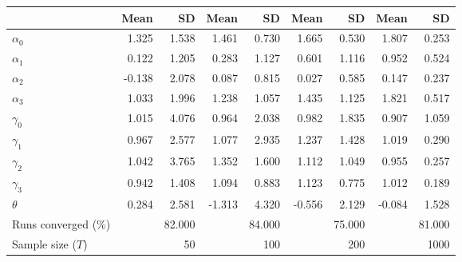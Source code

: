 
\begin{tabular}[t]{lrrrrrrrr}
\toprule
  & Mean & SD & Mean  & SD  & Mean   & SD   & Mean    & SD   \\
\midrule
$\alpha_{0}$ & 1.325 & 1.538 & 1.461 & 0.730 & 1.665 & 0.530 & 1.807 & 0.253\\
$\alpha_{1}$ & 0.122 & 1.205 & 0.283 & 1.127 & 0.601 & 1.116 & 0.952 & 0.524\\
$\alpha_{2}$ & -0.138 & 2.078 & 0.087 & 0.815 & 0.027 & 0.585 & 0.147 & 0.237\\
$\alpha_{3}$ & 1.033 & 1.996 & 1.238 & 1.057 & 1.435 & 1.125 & 1.821 & 0.517\\
$\gamma_{0}$ & 1.015 & 4.076 & 0.964 & 2.038 & 0.982 & 1.835 & 0.907 & 1.059\\
$\gamma_{1}$ & 0.967 & 2.577 & 1.077 & 2.935 & 1.237 & 1.428 & 1.019 & 0.290\\
$\gamma_{2}$ & 1.042 & 3.765 & 1.352 & 1.600 & 1.112 & 1.049 & 0.955 & 0.257\\
$\gamma_{3}$ & 0.942 & 1.408 & 1.094 & 0.883 & 1.123 & 0.775 & 1.012 & 0.189\\
$\theta$ & 0.284 & 2.581 & -1.313 & 4.320 & -0.556 & 2.129 & -0.084 & 1.528\\
Runs converged (\%) &  & 82.000 &  & 84.000 &  & 75.000 &  & 81.000\\
Sample size ($T$) &  & 50 &  & 100 &  & 200 &  & 1000\\
\bottomrule
\end{tabular}
